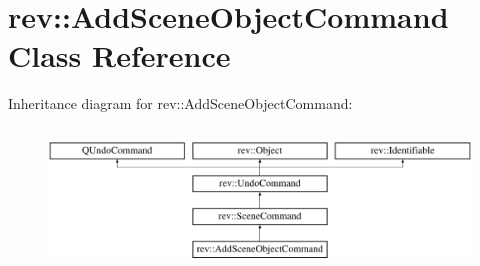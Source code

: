 \hypertarget{classrev_1_1_add_scene_object_command}{}\section{rev\+::Add\+Scene\+Object\+Command Class Reference}
\label{classrev_1_1_add_scene_object_command}
Inheritance diagram for rev\+::Add\+Scene\+Object\+Command\+:\begin{figure}[H]
\begin{center}
\leavevmode
\includegraphics[height=3.809524cm]{classrev_1_1_add_scene_object_command}
\end{center}
\end{figure}
